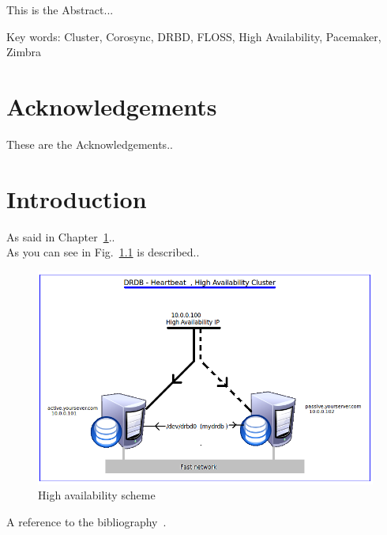 \documentclass[a4paper, 12pt]{book}
\begin{document}
This is the Abstract...

\noindent
Key words: Cluster, Corosync, DRBD, FLOSS, High Availability, Pacemaker, Zimbra

%
\chapter*{Acknowledgements}
\label{chap:acknowledgements}

These are the Acknowledgements..

%
\tableofcontents  	%
\listoffigures  	%
\listoftables 		%

%
\chapter{Introduction}
\label{chap:introduction}

As said in Chapter~\ref{chap:introduction}..\\

\noindent
As you can see in Fig.~\ref{fig:HAScheme} is described..

\begin{figure}[H]
  \centering
  \includegraphics[scale=0.50]{drdb_hearbeat.png}
  \caption[High availability scheme]{High availability scheme}
  \label{fig:HAScheme}
\end{figure}

A reference to the bibliography~\cite{Fogel}.\\
\end{document}
